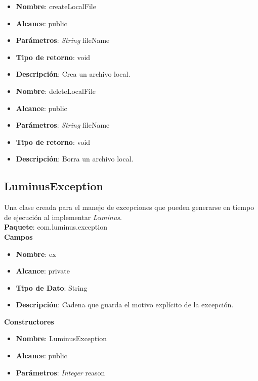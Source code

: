 \begin{UClist}
\begin{itemize}
		\item \textbf{Nombre}: createLocalFile
		\item \textbf{Alcance}: public
		\item \textbf{Parámetros}: \emph{String} fileName
		\item \textbf{Tipo de retorno}: void
		\item \textbf{Descripción}: Crea un archivo local.\\
	\end{itemize}
	\begin{itemize}
		\item \textbf{Nombre}: deleteLocalFile
		\item \textbf{Alcance}: public
		\item \textbf{Parámetros}: \emph{String} fileName
		\item \textbf{Tipo de retorno}: void
		\item \textbf{Descripción}: Borra un archivo local.\\
	\end{itemize}
\end{UClist}
\subsection{LuminusException}
Una clase creada para el manejo de excepciones que pueden generarse en tiempo de ejecución al implementar \emph{Luminus}.\\
\textbf{Paquete}: com.luminus.exception\\
\textbf{Campos}
\begin{UClist}
	\begin{itemize}
		\item \textbf{Nombre}: ex
		\item \textbf{Alcance}: private
		\item \textbf{Tipo de Dato}: String
		\item \textbf{Descripción}: Cadena que guarda el motivo explícito de la excepción.\\
	\end{itemize}
\end{UClist}
\textbf{Constructores}
\begin{UClist}
	\begin{itemize}
		\item \textbf{Nombre}: LuminusException
		\item \textbf{Alcance}: public
		\item \textbf{Parámetros}: \emph{Integer} reason\\
	\end{itemize}
\end{UClist}
